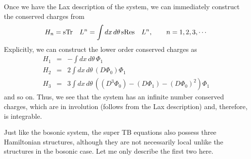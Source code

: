 \documentclass[a4paper,11pt]{article}
\begin{document}
Once we have the Lax description of the system, we can immediately
construct the conserved charges from
\begin{equation}
H_{n} = {\rm sTr}\quad L^{n} = \int dx\,d\theta\, {\rm sRes}\quad
L^{n},\qquad n = 1,2,3,\cdots
\end{equation}
Explicitly, we can construct the lower order conserved charges as
\begin{eqnarray}
H_{1} & = & - \int dx\,d\theta\, \Phi_{1}\nonumber\\
H_{2} & = & 2 \int dx\,d\theta\, (D\Phi_{0})\Phi_{1}\nonumber\\
H_{3} & = & 3 \int dx\,d\theta\,\left((D^{3}\Phi_{0}) - (D\Phi_{1}) -
(D\Phi_{0})^{2}\right)\Phi_{1} 
\end{eqnarray}
and so on. Thus, we see that the system has an infinite number
conserved charges, which are in involution (follows from the Lax
description) and, therefore, is integrable.


Just like the bosonic system, the super TB equations also possess
three Hamiltonian structures, although they are not necessarily local
unlike the structures in the bosonic case. Let me only describe the
first two here.
\end{document}
